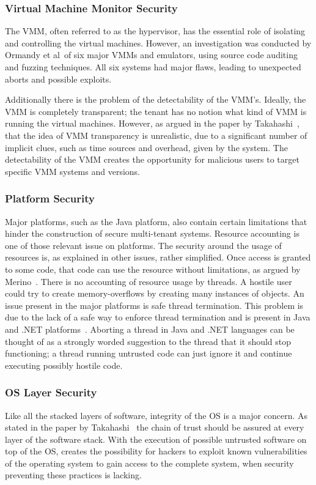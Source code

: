 \subsubsection{Virtual Machine Monitor Security}
The \acl{VMM}, often referred to as the hypervisor, has the essential role of isolating and controlling the virtual machines. 
However, an investigation was conducted by Ormandy et al~\cite{Ormandy2007Security}of six major \acp{VMM} and emulators, using source code auditing and fuzzing techniques. All six systems had major flaws, leading to unexpected aborts and possible exploits.

Additionally there is the problem of the detectability of the \ac{VMM}’s. Ideally, the \ac{VMM} is completely transparent; the tenant has no notion what kind of \ac{VMM} is running the virtual machines. 
However, as argued in the paper by Takahashi~\cite{Takahashi2012Security}, that the idea of \ac{VMM} transparency is unrealistic, due to a significant number of implicit clues, such as time sources and overhead, given by the system. 
The detectability of the \ac{VMM} creates the opportunity for malicious users to target specific \ac{VMM} systems and versions.

\subsubsection{Platform Security}
Major platforms, such as the Java platform, also contain certain limitations that hinder the construction of secure multi-tenant systems. 
Resource accounting is one of those relevant issue on platforms. 
The security around the usage of resources is, as explained in other issues, rather simplified. 
Once access is granted to some code, that code can use the resource without limitations, as argued by Merino~\cite{Merino2011Security}. 
There is no accounting of resource usage by threads. 
A hostile user could try to create memory-overflows by creating many instances of objects.
An issue present in the major platforms is safe thread termination. 
This problem is due to the lack of a safe way to enforce thread termination and is present in Java and .NET platforms~\cite{Merino2011Security}. 
Aborting a thread in Java and .NET languages can be thought of as a strongly worded suggestion to the thread that it should stop functioning; a thread running untrusted code can just ignore it and continue executing possibly hostile code.

\subsubsection{OS Layer Security}
Like all the stacked layers of software, integrity of the OS is a major concern. 
As stated in the paper by Takahashi~\cite{Takahashi2012Security} the chain of trust should be assured at every layer of the software stack.
With the execution of possible untrusted software on top of the OS, creates the possibility for hackers to exploit known vulnerabilities of the operating system to gain access to the complete system, when security preventing these practices is lacking.

